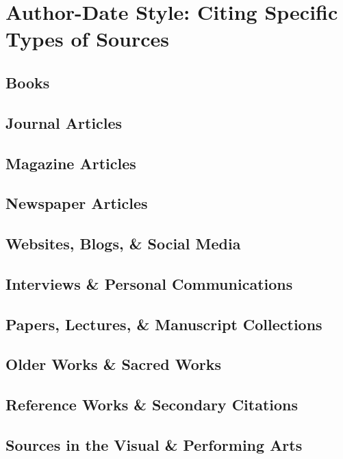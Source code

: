 \documentclass[oneside]{book}
\numberwithin{equation}{section}
\begin{document}

\chapter{Author-Date Style: Citing Specific Types of Sources}

\section{Books}

\section{Journal Articles}

\section{Magazine Articles}

\section{Newspaper Articles}

\section{Websites, Blogs, \& Social Media}

\section{Interviews \& Personal Communications}

\section{Papers, Lectures, \& Manuscript Collections}

\section{Older Works \& Sacred Works}

\section{Reference Works \& Secondary Citations}

\section{Sources in the Visual \& Performing Arts}
\end{document}
